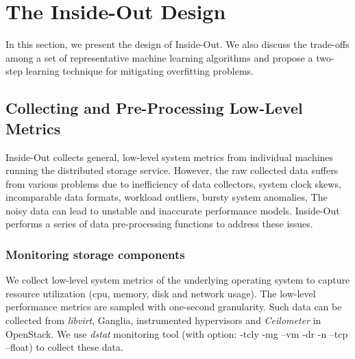 \section{The Inside-Out Design}
\label{sec:methodology}
In this section, we present the design of Inside-Out.
We also discuss the trade-offs among a set of representative machine learning algorithms
and propose a two-step learning technique for mitigating overfitting problems.



\subsection{Collecting and Pre-Processing Low-Level Metrics}
\label{sec:data_preprocessing}

Inside-Out collects general, low-level system metrics from individual machines running the distributed storage service.
However, the raw collected data suffers from various problems due to inefficiency of data collectors, system clock skews,
incomparable data formats, workload outliers, bursty system anomalies, \etc
The noisy data can lead to unstable and 
inaccurate performance models. 
Inside-Out performs a series of data pre-processing functions to address these issues.





\subsubsection{Monitoring storage components}
We collect low-level system metrics of the underlying operating system to capture resource utilization 
(\eg cpu, memory, disk and network usage).  
The low-level performance metrics are sampled with one-second granularity.
Such data can be collected from \textit{libvirt}, Ganglia, instrumented hypervisors \cite{Koh2007} and \textit{Ceilometer} in OpenStack.
We use  \emph{dstat} monitoring tool (with option: -tcly -mg --vm -dr -n --tcp --float) to collect these data.


